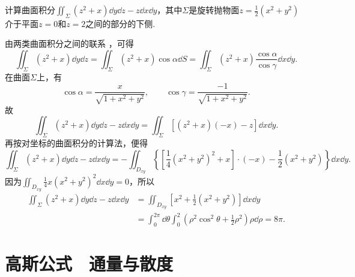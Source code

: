 \begin{example}
\def\ys{\iint_{\Sigma} (z^2+x) \dd{y}\dd{z} - z \dd{x}\dd{y}}%
计算曲面积分\(\ys\)，其中\(\Sigma\)是旋转抛物面\(z = \frac{1}{2}(x^2+y^2)\)介于平面\(z=0\)和\(z=2\)之间的部分的下侧.
\begin{solution}
由两类曲面积分之间的联系 ，可得\[
\iint_{\Sigma} (z^2+x) \dd{y}\dd{z}
= \iint_{\Sigma} (z^2+x) \cos\alpha \dd{S}
= \iint_{\Sigma} (z^2+x) \frac{\cos\alpha}{\cos\gamma} \dd{x}\dd{y}.
\]在曲面\(\Sigma\)上，有\[
\cos\alpha
= \frac{x}{\sqrt{1+x^2+y^2}},
\qquad
\cos\gamma
= \frac{-1}{\sqrt{1+x^2+y^2}}.
\]故\[
\ys
= \iint_{\Sigma} [(z^2+x)(-x) - z] \dd{x}\dd{y}.
\]
再按对坐标的曲面积分的计算法，便得\[
\ys
= - \iint_{D_{xy}} \left\{
	\left[
		\frac{1}{4} (x^2+y^2)^2
		+ x
	\right] \cdot (-x)
	- \frac{1}{2} (x^2+y^2)
\right\} \dd{x}\dd{y}.
\]因为\(\iint_{D_{xy}} \frac{1}{4} x(x^2+y^2)^2 \dd{x}\dd{y} = 0\)，所以\begin{align*}
\ys
&= \iint_{D_{xy}} \left[x^2+\frac{1}{2}(x^2+y^2)\right] \dd{x}\dd{y} \\
&= \int_0^{2\pi} \dd{\theta} \int_0^2 \left(\rho^2 \cos^2\theta + \frac{1}{2} \rho^2\right) \rho \dd{\rho}
= 8\pi.
\end{align*}
\end{solution}
\end{example}

\section{高斯公式　通量与散度}
